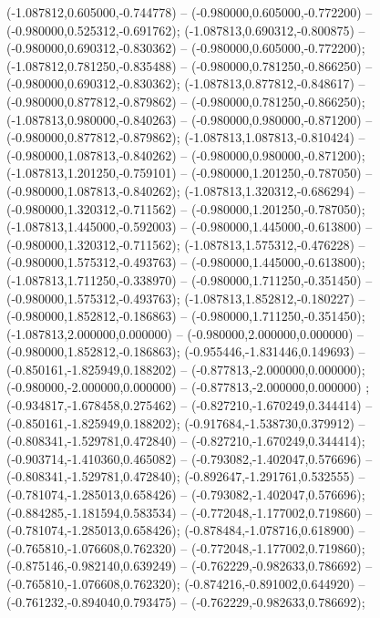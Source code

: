 (-1.087812,0.605000,-0.744778) -- (-0.980000,0.605000,-0.772200) -- (-0.980000,0.525312,-0.691762);
 (-1.087813,0.690312,-0.800875) -- (-0.980000,0.690312,-0.830362) -- (-0.980000,0.605000,-0.772200);
 (-1.087812,0.781250,-0.835488) -- (-0.980000,0.781250,-0.866250) -- (-0.980000,0.690312,-0.830362);
 (-1.087813,0.877812,-0.848617) -- (-0.980000,0.877812,-0.879862) -- (-0.980000,0.781250,-0.866250);
 (-1.087813,0.980000,-0.840263) -- (-0.980000,0.980000,-0.871200) -- (-0.980000,0.877812,-0.879862);
 (-1.087813,1.087813,-0.810424) -- (-0.980000,1.087813,-0.840262) -- (-0.980000,0.980000,-0.871200);
 (-1.087813,1.201250,-0.759101) -- (-0.980000,1.201250,-0.787050) -- (-0.980000,1.087813,-0.840262);
 (-1.087813,1.320312,-0.686294) -- (-0.980000,1.320312,-0.711562) -- (-0.980000,1.201250,-0.787050);
 (-1.087813,1.445000,-0.592003) -- (-0.980000,1.445000,-0.613800) -- (-0.980000,1.320312,-0.711562);
 (-1.087813,1.575312,-0.476228) -- (-0.980000,1.575312,-0.493763) -- (-0.980000,1.445000,-0.613800);
 (-1.087813,1.711250,-0.338970) -- (-0.980000,1.711250,-0.351450) -- (-0.980000,1.575312,-0.493763);
 (-1.087813,1.852812,-0.180227) -- (-0.980000,1.852812,-0.186863) -- (-0.980000,1.711250,-0.351450);
 (-1.087813,2.000000,0.000000) -- (-0.980000,2.000000,0.000000) -- (-0.980000,1.852812,-0.186863);
 (-0.955446,-1.831446,0.149693) -- (-0.850161,-1.825949,0.188202) -- (-0.877813,-2.000000,0.000000);
 (-0.980000,-2.000000,0.000000) -- (-0.877813,-2.000000,0.000000) ;
 (-0.934817,-1.678458,0.275462) -- (-0.827210,-1.670249,0.344414) -- (-0.850161,-1.825949,0.188202);
 (-0.917684,-1.538730,0.379912) -- (-0.808341,-1.529781,0.472840) -- (-0.827210,-1.670249,0.344414);
 (-0.903714,-1.410360,0.465082) -- (-0.793082,-1.402047,0.576696) -- (-0.808341,-1.529781,0.472840);
 (-0.892647,-1.291761,0.532555) -- (-0.781074,-1.285013,0.658426) -- (-0.793082,-1.402047,0.576696);
 (-0.884285,-1.181594,0.583534) -- (-0.772048,-1.177002,0.719860) -- (-0.781074,-1.285013,0.658426);
 (-0.878484,-1.078716,0.618900) -- (-0.765810,-1.076608,0.762320) -- (-0.772048,-1.177002,0.719860);
 (-0.875146,-0.982140,0.639249) -- (-0.762229,-0.982633,0.786692) -- (-0.765810,-1.076608,0.762320);
 (-0.874216,-0.891002,0.644920) -- (-0.761232,-0.894040,0.793475) -- (-0.762229,-0.982633,0.786692);
